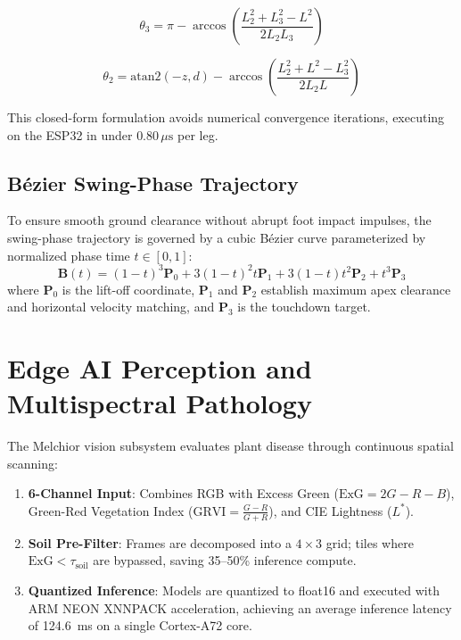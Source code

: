\documentclass[conference]{IEEEtran}
\begin{document}
\begin{equation}
\theta_3 = \pi - \arccos\left(\frac{L_2^2 + L_3^2 - L^2}{2 L_2 L_3}\right)
\end{equation}

\begin{equation}
\theta_2 = \text{atan2}(-z, d) - \arccos\left(\frac{L_2^2 + L^2 - L_3^2}{2 L_2 L}\right)
\end{equation}

This closed-form formulation avoids numerical convergence iterations, executing on the ESP32 in under $0.80\,\mu\text{s}$ per leg.

\subsection{Bézier Swing-Phase Trajectory}
To ensure smooth ground clearance without abrupt foot impact impulses, the swing-phase trajectory is governed by a cubic Bézier curve parameterized by normalized phase time $t \in [0, 1]$:
\begin{equation}
\mathbf{B}(t) = (1-t)^3 \mathbf{P}_0 + 3(1-t)^2 t \mathbf{P}_1 + 3(1-t) t^2 \mathbf{P}_2 + t^3 \mathbf{P}_3
\end{equation}
where $\mathbf{P}_0$ is the lift-off coordinate, $\mathbf{P}_1$ and $\mathbf{P}_2$ establish maximum apex clearance and horizontal velocity matching, and $\mathbf{P}_3$ is the touchdown target.

\section{Edge AI Perception and Multispectral Pathology}
The Melchior vision subsystem evaluates plant disease through continuous spatial scanning:
\begin{enumerate}
    \item \textbf{6-Channel Input}: Combines RGB with Excess Green ($\text{ExG} = 2G - R - B$), Green-Red Vegetation Index ($\text{GRVI} = \frac{G - R}{G + R}$), and CIE Lightness ($L^*$).
    \item \textbf{Soil Pre-Filter}: Frames are decomposed into a $4 \times 3$ grid; tiles where $\text{ExG} < \tau_{\text{soil}}$ are bypassed, saving 35--50\% inference compute.
    \item \textbf{Quantized Inference}: Models are quantized to float16 and executed with ARM NEON XNNPACK acceleration, achieving an average inference latency of 124.6~ms on a single Cortex-A72 core.
\end{enumerate}
\end{document}
